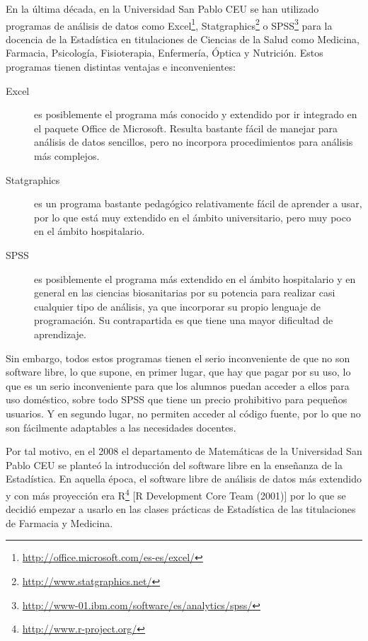 \documentclass[10pt,twoside,spanish]{article}
\numberwithin{equation}{section}
\begin{document}
En la última década, en la  Universidad San Pablo CEU se han utilizado programas de análisis de datos como
Excel\footnote{\url{http://office.microsoft.com/es-es/excel/}}, Statgraphics\footnote{\url{http://www.statgraphics.net/}} o
SPSS\footnote{\url{http://www-01.ibm.com/software/es/analytics/spss/}} para la docencia de la Estadística en titulaciones de Ciencias de la
Salud como Medicina, Farmacia, Psicología, Fisioterapia, Enfermería, Óptica y Nutrición. 
Estos programas tienen distintas ventajas e inconvenientes:
\begin{description}
\item[Excel] es posiblemente el programa más conocido y extendido por ir integrado en el paquete Office de Microsoft. Resulta
bastante fácil de manejar para análisis de datos sencillos, pero no incorpora procedimientos para análisis más complejos.
\item[ Statgraphics] es un programa bastante pedagógico relativamente fácil de aprender a usar, por lo que está muy extendido en el ámbito
universitario, pero muy poco en el ámbito hospitalario.
\item[SPSS] es posiblemente el programa más extendido en el ámbito hospitalario y en general en las ciencias biosanitarias por su potencia
para realizar casi cualquier tipo de análisis, ya que incorporar su propio lenguaje de programación. 
Su contrapartida es que tiene una mayor dificultad de aprendizaje.
\end{description}
Sin embargo, todos estos programas tienen el serio inconveniente de que no son software libre, lo que supone, en primer lugar, que hay que
pagar por su uso, lo que es un serio inconveniente para que los alumnos puedan acceder a ellos para  uso doméstico, sobre todo SPSS que
tiene un precio prohibitivo para pequeños usuarios.
Y en segundo lugar, no permiten acceder al código fuente, por lo que no son fácilmente adaptables a las necesidades docentes.

Por tal motivo, en el 2008 el departamento de Matemáticas de la Universidad San Pablo CEU se planteó la introducción del software libre en
la enseñanza de la Estadística.
En aquella época, el software libre de análisis de datos más extendido y con más proyección era R\footnote{\url{http://www.r-project.org/}}
[R Development Core Team (2001)] por lo que se decidió empezar a usarlo en las clases prácticas de Estadística de las titulaciones de
Farmacia y Medicina.
\end{document}
